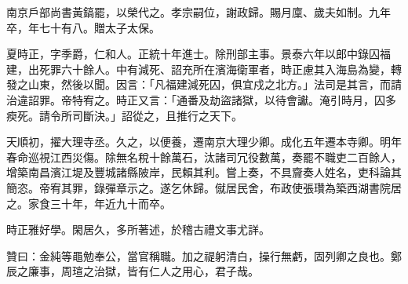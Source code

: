 \begin{pinyinscope}
南京戶部尚書黃鎬罷，以榮代之。孝宗嗣位，謝政歸。賜月廩、歲夫如制。九年卒，年七十有八。贈太子太保。

夏時正，字季爵，仁和人。正統十年進士。除刑部主事。景泰六年以郎中錄囚福建，出死罪六十餘人。中有減死、詔充所在濱海衛軍者，時正慮其入海島為變，轉發之山東，然後以聞。因言：「凡福建減死囚，俱宜戍之北方。」法司是其言，而請治違詔罪。帝特宥之。時正又言：「通番及劫盜諸獄，以待會讞。淹引時月，囚多瘐死。請令所司斷決。」詔從之，且推行之天下。

天順初，擢大理寺丞。久之，以便養，遷南京大理少卿。成化五年遷本寺卿。明年春命巡視江西災傷。除無名稅十餘萬石，汰諸司冗役數萬，奏罷不職吏二百餘人，增築南昌濱江堤及豐城諸縣陂岸，民賴其利。嘗上奏，不具齎奏人姓名，吏科論其簡恣。帝宥其罪，錄彈章示之。遂乞休歸。僦居民舍，布政使張瓚為築西湖書院居之。家食三十年，年近九十而卒。

時正雅好學。閑居久，多所著述，於稽古禮文事尤詳。

贊曰：金純等黽勉奉公，當官稱職。加之禔躬清白，操行無虧，固列卿之良也。鄭辰之廉事，周瑄之治獄，皆有仁人之用心，君子哉。


\end{pinyinscope}